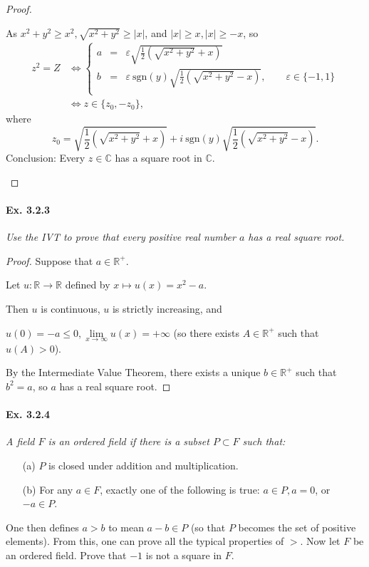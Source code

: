 \documentclass[11pt,a4paper]{article}
\newcommand{\R}{\mathbb{R}}
\newcommand{\C}{\mathbb{C}}
\begin{document}
\begin{proof}
\begin{enumerate}
As $x^2+y^2 \geq x^2, \sqrt{x^2+y^2} \geq \vert x \vert $, and $\vert x \vert \geq x, \vert x \vert \geq -x$, so
\begin{align*}z^2 = Z &\iff
\left\{
\begin{array}{ccl}
a  &=&\varepsilon \sqrt{\frac{1}{2}\left ( \sqrt{x^2+y^2}  + x\right)}  \\
 b &=&\varepsilon\ \mathrm{sgn}(y)\sqrt{\frac{1}{2}\left( \sqrt{x^2+y^2} -x\right)},\qquad  \varepsilon \in \{-1,1\} \\
\end{array}
\right.\\
&\iff z \in \{ z_0, - z_0   \},
\end{align*}
where $$z_0 = \sqrt{\frac{1}{2}\left ( \sqrt{x^2+y^2}  + x\right)} + i \ \mathrm{sgn}(y)\sqrt{\frac{1}{2}\left( \sqrt{x^2+y^2} -x\right)}.$$
Conclusion: Every $z \in \mathbb{C}$ has a square root in $\C$.
\end{enumerate}
\end{proof}

\paragraph{Ex. 3.2.3}

{\it Use the IVT to prove that every positive real number $a$ has a real square root.
}

\begin{proof}
Suppose that $a \in \mathbb{R}^+$.

Let $u:\mathbb{R} \to \mathbb{R}$ defined by $x\mapsto u(x) = x^2 -a$.

Then  $u$ is continuous,  $u$ is strictly increasing, and

$u(0) = -a \leq 0, \lim\limits_{x\to \infty} u(x) = + \infty$ (so there exists $A \in \R^{+}$ such that $u(A)>0$).

By the Intermediate Value Theorem, there exists a unique $b\in \mathbb{R}^+$ such that $b^2 = a$, so $a$ has a real square root.
\end{proof}

\paragraph{Ex. 3.2.4}

{\it A field $F$ is an ordered field if there is a subset $P \subset F$ such that:
\begin{enumerate}
\item[(a)] $P$ is closed under addition and multiplication.
\item[(b)] For any $a\in F$, exactly one of the following is true: $a \in P, a = 0$, or $-a\in P$.
\end{enumerate}
One then defines $a>b$ to mean $a-b\in P$ (so that $P$ becomes the set of positive elements). From this, one can prove all the typical properties of $>$. Now let $F$ be an ordered field. Prove that $-1$ is not a square in $F$.
}
\end{document}
